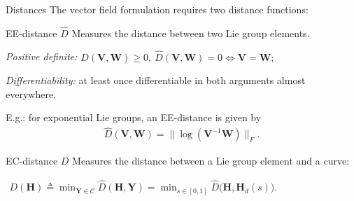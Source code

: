 \begin{frame}{Distances}
    The vector field formulation requires two distance functions:
    \begin{exampleblock}{EE-distance $\widehat{D}$}
        Measures the distance between two Lie group elements.

        \quad\emph{Positive definite:} $\widehat{D}(\mathbf{V}, \mathbf{W})\ge0,\ \widehat{D}(\mathbf{V},\mathbf{W})=0\iff\mathbf{V}=\mathbf{W};$

        \quad\emph{Differentiability:} at least once differentiable in both arguments almost everywhere.        
    \end{exampleblock}
    E.g.: for exponential Lie groups, an EE-distance is given by
    \begin{align*}
        \widehat{D}(\mathbf{V}, \mathbf{W}) = \bigl\|\log(\mathbf{V}^{-1}\mathbf{W})\bigr\|_F.
    \end{align*}

    \begin{exampleblock}{EC-distance $D$}
        Measures the distance between a Lie group element and a curve:

        {\centering $\displaystyle 
        \begin{aligned} D(\mathbf{H}) \triangleq \min_{\mathbf{Y}\in\mathcal{C}}\widehat{D}(\mathbf{H}, \mathbf{Y}) =
        \min_{s\in[0,1]} \widehat{D}\bigl(\mathbf{H}, \mathbf{H}_d(s)\bigr).
        \end{aligned}$ 
        \par}%
    \end{exampleblock}
\end{frame}

